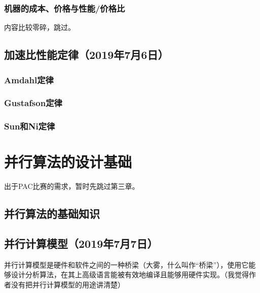 \documentclass{article}
\begin{document}
			\subsubsection{机器的成本、价格与性能/价格比}
				内容比较零碎，跳过。
		\subsection{加速比性能定律（2019年7月6日）}
			\subsubsection{Amdahl定律}
			\subsubsection{Gustafson定律}
			\subsubsection{Sun和Ni定律}
	\section{并行算法的设计基础}
		出于PAC比赛的需求，暂时先跳过第三章。
		\subsection{并行算法的基础知识}
		\subsection{并行计算模型（2019年7月7日）}
			并行计算模型是硬件和软件之间的一种桥梁（大雾，什么叫作``桥梁''），使用它能够设计分析算法，在其上高级语言能被有效地编译且能够用硬件实现。（我觉得作者没有把并行计算模型的用途讲清楚）
\end{document}

